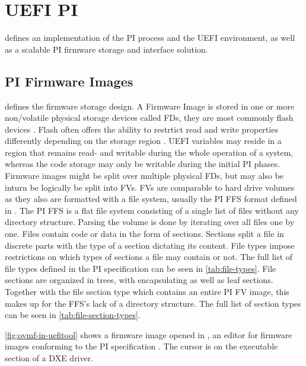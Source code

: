 
\section{\acs{UEFI} \acf{PI}}

\cite{pi-spec} defines an implementation of the \ac{PI} process and the \ac{UEFI} environment, as well as a scalable \ac{PI} firmware storage and interface solution.

\subsection{\acs{PI} Firmware Images}

\cite[Vol. 3, 2]{pi-spec} defines the firmware storage design.
A Firmware Image is stored in one or more non\-/volatile physical storage devices called \acp{FD}, they are most commonly flash devices \cite[Vol. 3, 2.1]{pi-spec}.
Flash often offers the ability to restrtict read and write properties differently depending on the storage region \cite[Vol. 3, 2.1.1]{pi-spec}.
\ac{UEFI} variables may reside in a region that remains read- and writable during the whole operation of a system, whereas the code storage may only be writable during the initial \ac{PI} phases.
Firmware images might be split over multiple physical \acp{FD}, but may also be inturn be logically be split into \acp{FV}.
\acp{FV} are comparable to hard drive volumes as they also are formatted with a file system, usually the \ac{PI} \ac{FFS} format defined in \cite[Vol. 3, 2.2]{pi-spec}.
The \ac{PI} \ac{FFS} is a flat file system consisting of a single list of files without any directory structure.
Parsing the volume is done by iterating over all files one by one.
Files contain code or data in the form of sections.
Sections split a file in discrete parts with the type of a section dictating its content.
File types impose restrictions on which types of sections a file may contain or not.
The full list of file types defined in the \ac{PI} specification can be seen in \autoref{tab:file-types}.
File sections are organized in trees, with encapsulating as well as leaf sections.
Together with the file section type  which contains an entire \ac{PI} \ac{FV} image, this makes up for the \ac{FFS}'s lack of a directory structure.
The full list of section types can be seen in \autoref{tab:file-section-types}.

\autoref{fig:ovmf-in-uefitool} shows a firmware image opened in , an editor for firmware images conforming to the \ac{PI} specification \cite{uefitool}.
The cursor is on the executable section of a \acs{DXE} driver.

